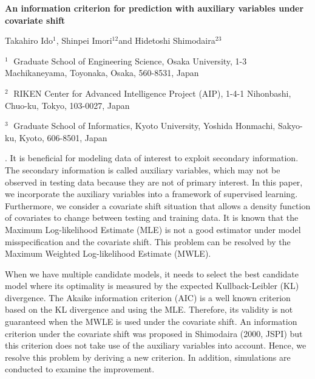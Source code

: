 \documentclass[12pt]{article}
\begin{document}
\begin{flushleft}


{\LARGE\bf  An information criterion for prediction with auxiliary variables under covariate shift}

\vspace{1.0cm}

Takahiro Ido$^1$, Shinpei Imori$^{12}$and Hidetoshi Shimodaira$^{23}$

\begin{description}

\item $^1 \;$ Graduate School of Engineering Science, Osaka University,
1-3 Machikaneyama, Toyonaka, Osaka, 560-8531, Japan

\item $^2 \;$ RIKEN Center for Advanced Intelligence Project (AIP), 
1-4-1 Nihonbashi, Chuo-ku, Tokyo, 103-0027, Japan

\item $^3 \;$ Graduate School of Informatics, Kyoto University,
Yoshida Honmachi, Sakyo-ku, Kyoto, 606-8501, Japan

\end{description}

\end{flushleft}


\vspace{0.75cm}

. 
It is beneficial for modeling data of interest to exploit secondary information. 
The secondary information is called auxiliary variables, which may not be observed in testing data because they are not of primary interest. 
In this paper, we incorporate the auxiliary variables into a framework of supervised learning. 
Furthermore, we consider a covariate shift situation that allows a density function of covariates to change between testing and training data. 
It is known that the Maximum Log-likelihood Estimate (MLE) is not a good estimator under model misspecification and the covariate shift. 
This problem can be resolved by the Maximum Weighted Log-likelihood Estimate (MWLE). 

When we have multiple candidate models, it needs to select the best candidate model where its optimality is measured by the expected Kullback-Leibler (KL) divergence. 
The Akaike information criterion (AIC) is a well known criterion based on the KL divergence and using the MLE.  
Therefore, its validity is not guaranteed when the MWLE is used under the covariate shift. 
An information criterion under the covariate shift was proposed in Shimodaira (2000, JSPI) but this criterion does not take use of the auxiliary variables into account. 
Hence, we resolve this problem by deriving a new criterion. 
In addition, simulations are conducted to examine the improvement. 
\end{document}
